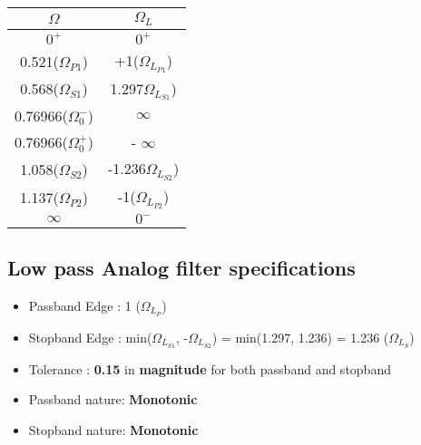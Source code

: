 \documentclass{article}
\begin{document}
\begin{table}[H]
		\begin{center}
		\begin{tabular}{|c|c|}
			\hline
			$\Omega$ & $\Omega_L$\\
			
			\hline
                $0^+$ & $0^+$\\
                \hline
                0.521($\Omega_{P1}$) & +1($\Omega_{L_{P1}}$) \\
                \hline
                0.568($\Omega_{S1}$) & 1.297$\Omega_{L_{S1}}$)\\
                \hline
                0.76966($\Omega_0^-$) & $\infty$\\
                \hline
                0.76966($\Omega_0^+$) & - $\infty$\\
                \hline
                1.058($\Omega_{S2}$) & -1.236$\Omega_{L_{S2}}$)\\
                \hline
                1.137($\Omega_{P2}$) & -1($\Omega_{L_{P2}}$)\\
                \hline
                $\infty$ & $0^-$\\
                \hline
            
		\end{tabular}
		\end{center}
\end{table}

\subsection{Low pass Analog filter specifications}

\begin{itemize}
    \item Passband Edge : 1 ($\Omega_{L_{P}}$)
    \item Stopband Edge : min($\Omega_{L_{S1}}$, -$\Omega_{L_{S2}}$) = min(1.297, 1.236) = 1.236 ($\Omega_{L_{S}}$)
    \item  Tolerance : \textbf{0.15} in \textbf{magnitude} for both passband and stopband
    \item Passband nature: \textbf{Monotonic}
    \item Stopband nature: \textbf{Monotonic}
\end{itemize}
\end{document}
